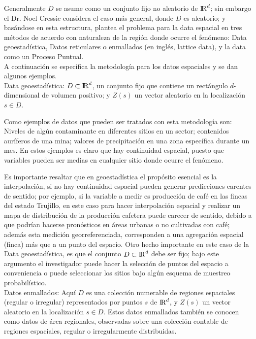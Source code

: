 \documentclass[12pt]{report}
\begin{document}
	Generalmente $D$ se asume como un conjunto fijo no aleatorio de  $ {\rm I\!R}^{d} $; sin embargo el Dr. Noel Cressie \cite{Cress} considera el caso más general, donde $D$ es aleatorio; y basándose en esta estructura, plantea el problema para la data espacial en tres métodos de acuerdo con naturaleza de la región donde ocurre el fenómeno: Data geoestadística, Datos reticulares o enmallados (en inglés, lattice data), y la data como un Proceso Puntual. \\
	
	
	
	A continuación se especifica la metodología para los datos espaciales y se dan algunos ejemplos.  \\
	
	
	Data geoestadística:  $D \subset{\rm I\!R}^{d}$,   un conjunto fijo que contiene un rectángulo
	$d$-dimensional de volumen positivo; y $Z(s)$ un vector aleatorio en la localización $s \in D.$ 
	
	Como ejemplos de datos que pueden ser tratados con esta metodología son: Niveles de algún contaminante en diferentes sitios en un sector; contenidos auríferos de una mina; valores de precipitación en una zona específica durante un mes. En estos ejemplos es claro que hay continuidad espacial, puesto que variables pueden ser medias en cualquier sitio donde ocurre el fenómeno. 
	
	Es importante resaltar que en geoestadística el propósito esencial es la interpolación, si no hay continuidad espacial pueden generar predicciones carentes de sentido; por ejemplo, si la variable a  medir es producción de café en las fincas  del estado Trujillo, en este caso para hacer interpolación espacial y realizar un mapa de distribución de la producción cafetera puede carecer  de sentido, debido a que podrían hacerse pronósticos en áreas urbanas o no cultivadas con café; además esta medición georreferenciada, corresponden a una agregación espacial (finca) más que a un punto del espacio. 
	Otro hecho importante en este caso de la Data geoestadística, es que el conjunto   $D \subset{\rm I\!R}^{d}$  debe ser fijo; bajo este argumento el investigador puede hacer la selección de puntos del espacio a conveniencia o puede seleccionar los sitios bajo algún esquema de muestreo probabilístico.\\
	
	Datos   enmallados: Aquí $D$ es una colección numerable  de  regiones espaciales (regular o irregular) representados por puntos $s$ de $ {\rm I\!R}^{d}$, y $Z(s)$ un vector aleatorio en la localización $s \in D$.  Estos datos enmallados también se conocen como  datos de área regionales, observadas
	sobre una colección contable de regiones espaciales, regular o 	irregularmente distribuidas.
	
\end{document}
